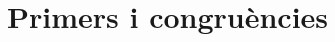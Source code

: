 \documentclass[11pt,fleqn]{book} %
\newcounter{let} \setcounter{let}{0}
\renewcommand{\1}{\mathbf{1}}
\newcommand{\0}{\mathbf{0}}
\begin{document}
\usechapterimagefalse %

\pagestyle{empty} %

\tableofcontents %

\cleardoublepage %

\pagestyle{fancy} %




\usechapterimagefalse
\chapter{Primers i congruències}
{
\let\paragraph\subsubsection
\let\subsubsection\subsection
\let\subsection\section


}
\end{document}
